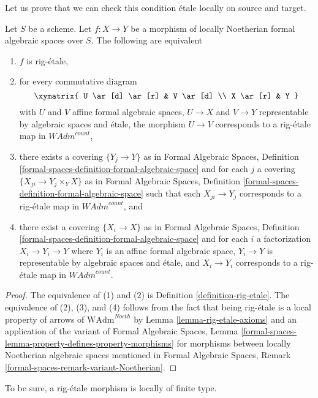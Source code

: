 \noindent
Let us prove that we can check this condition \'etale locally on
source and target.

\begin{lemma}
\label{lemma-rig-\'etale-morphisms}
Let $S$ be a scheme. Let $f : X \to Y$ be a morphism of
locally Noetherian formal algebraic spaces over $S$.
The following are equivalent
\begin{enumerate}
\item $f$ is rig-\'etale,
\item for every commutative diagram
$$
\xymatrix{
U \ar[d] \ar[r] & V \ar[d] \\
X \ar[r] & Y
}
$$
with $U$ and $V$ affine formal algebraic spaces, $U \to X$ and $V \to Y$
representable by algebraic spaces and \'etale, the morphism $U \to V$
corresponds to a rig-\'etale map in $\textit{WAdm}^{count}$,
\item there exists a covering $\{Y_j \to Y\}$ as in
Formal Algebraic Spaces,
Definition \ref{formal-spaces-definition-formal-algebraic-space}
and for each $j$
a covering $\{X_{ji} \to Y_j \times_Y X\}$ as in
Formal Algebraic Spaces,
Definition \ref{formal-spaces-definition-formal-algebraic-space}
such that each $X_{ji} \to Y_j$  corresponds
to a rig-\'etale map in $\textit{WAdm}^{count}$, and
\item there exist a covering $\{X_i \to X\}$ as in
Formal Algebraic Spaces,
Definition \ref{formal-spaces-definition-formal-algebraic-space}
and for each $i$ a factorization $X_i \to Y_i \to Y$ where $Y_i$
is an affine formal algebraic space, $Y_i \to Y$ is representable
by algebraic spaces and \'etale, and $X_i \to Y_i$ corresponds
to a rig-\'etale map in $\textit{WAdm}^{count}$.
\end{enumerate}
\end{lemma}

\begin{proof}
The equivalence of (1) and (2) is Definition \ref{definition-rig-etale}.
The equivalence of (2), (3), and (4) follows from the fact that
being rig-\'etale is a local property of arrows of
$\text{WAdm}^{Noeth}$ by Lemma \ref{lemma-rig-etale-axioms}
and an application of the variant of
Formal Algebraic Spaces, Lemma
\ref{formal-spaces-lemma-property-defines-property-morphisms}
for morphisms between locally Noetherian algebraic spaces
mentioned in Formal Algebraic Spaces, Remark
\ref{formal-spaces-remark-variant-Noetherian}.
\end{proof}

\noindent
To be sure, a rig-\'etale morphism is locally of finite type.

